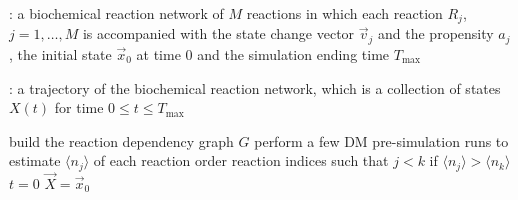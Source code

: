 \begin{algorithm}[H]
\DontPrintSemicolon
{}

\caption{\protect\TitleFunction{}}
\label{algo:odm}

\Input: a biochemical reaction network of $M$ reactions in which each reaction $R_j$, $j=1, \dots, M$ is accompanied with the state change vector $\vec{v}_j$ and the propensity $a_j$, the initial state $\vec{x}_0$ at time $0$ and the simulation ending time $T_{\max}$\;

\Output: a trajectory of the biochemical reaction network, which is a collection of states $X(t)$ for time $0\le t\le T_{\max}$\;

build the reaction dependency graph $G$\;
perform a few DM pre-simulation runs to estimate $\langle n_j\rangle$ of each reaction\;
order reaction indices such that $j<k$ if $\langle n_j\rangle>\langle n_k\rangle$\;
$t = 0$\;
$\vec{X} = \vec{x}_0$\;

\end{algorithm}
